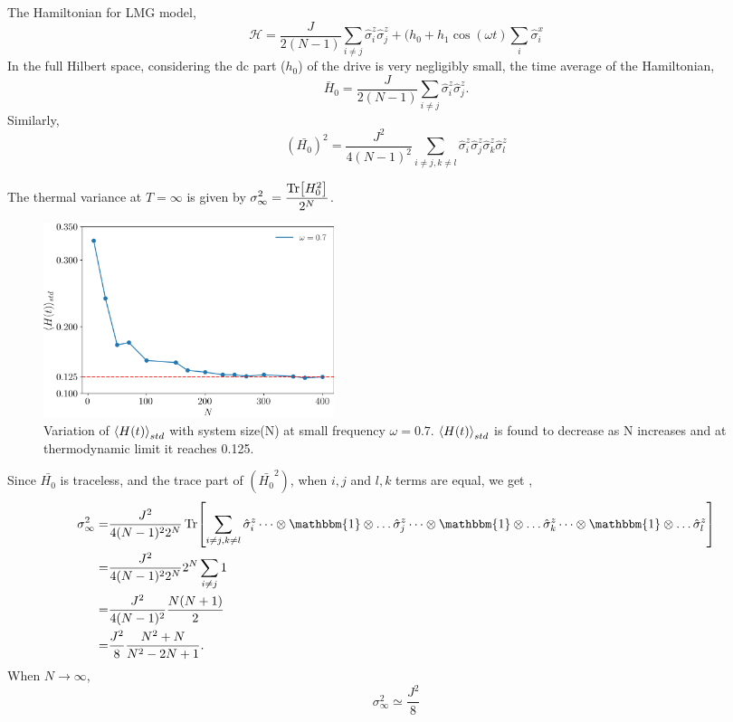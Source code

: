 \documentclass[aps,prb,reprint,showpacs,floatfix,superscriptaddress, onecolumn, nofootinbib, 9pt]{revtex4-2}
\begin{document}
\begin{enumerate}
{			
			The Hamiltonian for LMG model,
			\begin{equation}
				\mathcal{H} = \frac{J}{2(N-1)}\sum_{i\neq j}\hat{\sigma}^z_i \hat{\sigma}^z_j + (h_0 +h_1 \cos(\omega t) \sum_i \hat{\sigma}^x_i
			\end{equation}
			In the full Hilbert space, considering the dc part ($h_0$) of the drive is very negligibly small, the time average of the Hamiltonian,
			\begin{equation*}
				\bar{H}_0 = \frac{J}{2(N-1)}\sum_{i\neq j}\hat{\sigma}^z_i \hat{\sigma}^z_j.
			\end{equation*}
			Similarly,
			\begin{equation}
				\left(\bar{H_0}\right)^2 = \frac{J^2}{4(N-1)^2}\sum_{i\neq j, k \neq l} \hat{\sigma}^z_i \hat{\sigma}^z_j \hat{\sigma}^z_k \hat{\sigma}^z_l
			\end{equation}
			
			The thermal variance at $T= \infty$ is given by $\displaystyle \sigma^2_{\infty} = \frac{\Tr[H^2_0]}{2^N}$. 
			
			\begin{figure}[h!]
				\includegraphics[width=8.5cm]{hbar_avg_std_w0.7.jpg}
				\caption{Variation of $\expval{H(t)}_{std}$ with system size(N) at small frequency $\omega=0.7$. $\expval{H(t)}_{std}$ is found to decrease as N increases and at thermodynamic limit it reaches 0.125.}
				\label{fig:std_Ns}
			\end{figure}
			
			Since $\bar{H_0}$ is traceless, and the trace part of $\left(\bar{H_0}^2\right)$, when $i,j$ and $l,k$ terms are equal, we get ,
			\begin{align*}
				\sigma_\infty^2 =& \frac{J^2}{4(N-1)^2 2^N}\Tr[\sum_{i\neq j, k \neq l} \hat{\sigma}^z_i \dots\otimes \mathbbm{1} \otimes \dots \hat{\sigma}^z_j \dots\otimes \mathbbm{1} \otimes \dots \hat{\sigma}^z_k\dots\otimes \mathbbm{1} \otimes \dots \hat{\sigma}^z_l ]\\
				=& \frac{J^2}{4(N-1)^2 2^N}   2^N \sum_{i\neq j} 1\\
				=& \frac{J^2}{4(N-1)^2} \frac{N(N+1)}{2}\\
				=& \frac{J^2}{8} \frac{N^2+N}{N^2-2N+1}.
			\end{align*}
			When $N\rightarrow \infty$,
			\begin{equation}
				\sigma_\infty^2 \simeq \frac{J^2}{8}
				\label{eq:std_inf}
			\end{equation} 
			
}
\end{enumerate}
\end{document}
